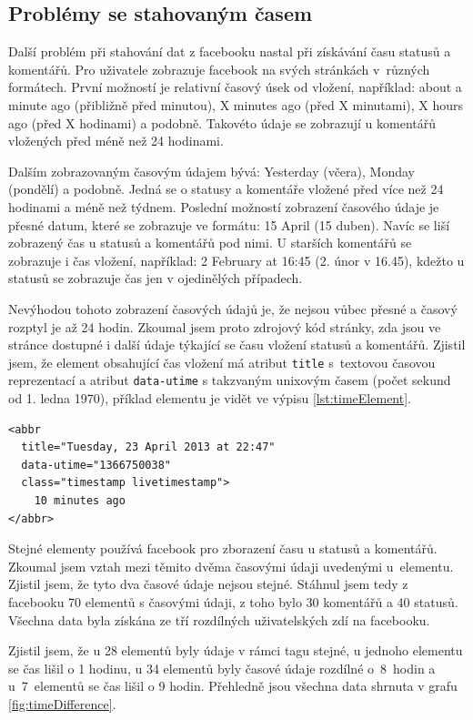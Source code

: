 \documentclass[thesis=M,czech]{FITthesis}[2013/05/10]
\begin{document}
\subsection{Problémy se stahovaným časem}

Další problém při stahování dat z facebooku nastal při získávání času statusů a komentářů. Pro uživatele zobrazuje facebook na svých stránkách v~různých formátech. První možností je relativní časový úsek od vložení, například: about a minute ago (přibližně před minutou), X minutes ago (před X minutami), X hours ago (před X hodinami) a podobně. Takovéto údaje se zobrazují u komentářů vložených před méně než 24 hodinami. 

Dalším zobrazovaným časovým údajem bývá: Yesterday (včera), Monday (pondělí) a podobně. Jedná se o statusy a komentáře vložené před více než 24 hodinami a méně než týdnem. Poslední možností zobrazení časového údaje je přesné datum, které se zobrazuje ve formátu: 15 April (15 duben). Navíc se liší zobrazený čas u statusů a komentářů pod nimi. U starších komentářů se zobrazuje i čas vložení, například: 2 February at 16:45 (2. únor v 16.45), kdežto u statusů se zobrazuje čas jen v ojedinělých případech.

Nevýhodou tohoto zobrazení časových údajů je, že nejsou vůbec přesné a časový rozptyl je až 24 hodin. Zkoumal jsem proto zdrojový kód stránky, zda jsou ve stránce dostupné i další údaje týkající se času vložení statusů a komentářů. Zjistil jsem, že element obsahující čas vložení má atribut \verb|title| s~textovou časovou reprezentací a atribut \verb|data-utime| s takzvaným unixovým časem (počet sekund od 1. ledna 1970), příklad elementu je vidět ve výpisu \ref{lst:timeElement}. 

\begin{lstlisting}[caption={Příklad elementu obsahující čas},label=lst:timeElement,belowcaptionskip=0.4cm]
<abbr 
  title="Tuesday, 23 April 2013 at 22:47"
  data-utime="1366750038" 
  class="timestamp livetimestamp">
    10 minutes ago
</abbr>
\end{lstlisting}

Stejné elementy používá facebook pro zborazení času u statusů a komentářů. Zkoumal jsem vztah mezi těmito dvěma časovými údaji uvedenými u~elementu. Zjistil jsem, že tyto dva časové údaje nejsou stejné. Stáhnul jsem tedy z facebooku 70 elementů s časovými údaji, z toho bylo 30 komentářů a 40 statusů. Všechna data byla získána ze tří rozdílných uživatelských zdí na facebooku. 

Zjistil jsem, že u 28 elementů byly údaje v rámci tagu stejné, u jednoho elementu se čas lišil o 1 hodinu, u 34 elementů byly časové údaje rozdílné o~8~hodin a u~7~elementů se čas lišil o 9 hodin. Přehledně jsou všechna data shrnuta v grafu \ref{fig:timeDifference}.
\end{document}
